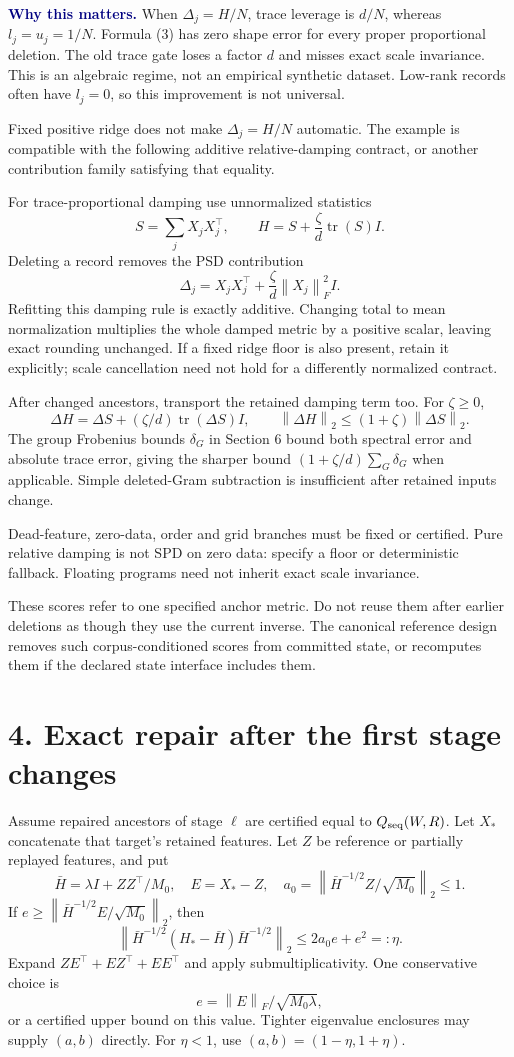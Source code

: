 \documentclass[11pt]{article}
\newcommand{\norm}[1]{\left\|#1\right\|}\newcommand{\tr}{\operatorname{tr}}
\newcommand{\note}[1]{\textcolor{navy}{\textbf{#1}}}
\begin{document}
\note{Why this matters.} When $\Delta_j=H/N$, trace leverage is $d/N$, whereas $l_j=u_j=1/N$. Formula (3) has zero shape error for every proper proportional deletion. The old trace gate loses a factor $d$ and misses exact scale invariance. This is an algebraic regime, not an empirical synthetic dataset. Low-rank records often have $l_j=0$, so this improvement is not universal.

Fixed positive ridge does not make $\Delta_j=H/N$ automatic. The example is compatible with the following additive relative-damping contract, or another contribution family satisfying that equality.

For trace-proportional damping use unnormalized statistics
\[
 S=\sum_j X_jX_j^{\top},\qquad H=S+\frac\zeta d\tr(S)I.
\]
Deleting a record removes the PSD contribution
\[
 \Delta_j=X_jX_j^{\top}+\frac\zeta d\norm{X_j}_F^2I. \tag{4}
\]
Refitting this damping rule is exactly additive. Changing total to mean normalization multiplies the whole damped metric by a positive scalar, leaving exact rounding unchanged. If a fixed ridge floor is also present, retain it explicitly; scale cancellation need not hold for a differently normalized contract.

After changed ancestors, transport the retained damping term too. For $\zeta\geq0$,
\[
 \Delta H=\Delta S+(\zeta/d)\tr(\Delta S)I,\qquad
 \norm{\Delta H}_2\leq(1+\zeta)\norm{\Delta S}_2.
\]
The group Frobenius bounds $\delta_G$ in Section 6 bound both spectral error and absolute trace error, giving the sharper bound $(1+\zeta/d)\sum_G\delta_G$ when applicable. Simple deleted-Gram subtraction is insufficient after retained inputs change.

Dead-feature, zero-data, order and grid branches must be fixed or certified. Pure relative damping is not SPD on zero data: specify a floor or deterministic fallback. Floating programs need not inherit exact scale invariance.

These scores refer to one specified anchor metric. Do not reuse them after earlier deletions as though they use the current inverse. The canonical reference design removes such corpus-conditioned scores from committed state, or recomputes them if the declared state interface includes them.

\newpage
\section*{4. Exact repair after the first stage changes}
Assume repaired ancestors of stage $\ell$ are certified equal to $Q_{\rm seq}(W,R)$. Let $X_*$ concatenate that target's retained features. Let $Z$ be reference or partially replayed features, and put
\[
 \bar H=\lambda I+ZZ^{\top}/M_0,\quad E=X_*-Z,\quad
 a_0=\norm{\bar H^{-1/2}Z/\sqrt{M_0}}_2\leq1.
\]
If $e\geq\norm{\bar H^{-1/2}E/\sqrt{M_0}}_2$, then
\[
 \norm{\bar H^{-1/2}(H_*-\bar H)\bar H^{-1/2}}_2
 \leq 2a_0e+e^2=:\eta. \tag{5}
\]
Expand $ZE^{\top}+EZ^{\top}+EE^{\top}$ and apply submultiplicativity. One conservative choice is
\[
 e=\norm E_F/\sqrt{M_0\lambda},
\]
or a certified upper bound on this value. Tighter eigenvalue enclosures may supply $(a,b)$ directly. For $\eta<1$, use $(a,b)=(1-\eta,1+\eta)$.
\end{document}
